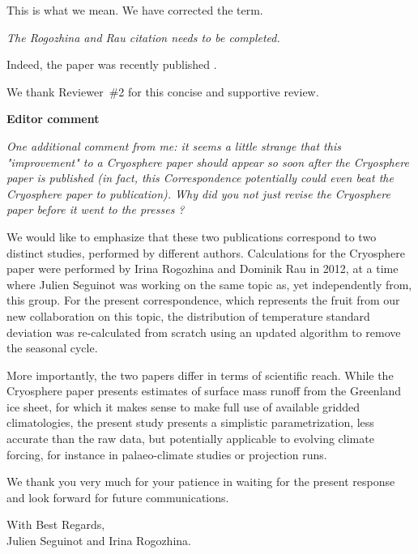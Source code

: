 \documentclass[10pt]{article}
\def\referee#1{\bigskip\textcolor{blue!50!black}{\textit{#1}}}
\begin{document}
This is what we mean. We have corrected the term.

\referee{The Rogozhina and Rau citation needs to be completed.}

Indeed, the paper was recently published \citep{rogozhina-rau-2014}. 

We thank Reviewer~{\#}2 for this concise and supportive review.


\bigskip
\textbf{Editor comment}

\referee{One additional comment from me: it seems a little strange that this "improvement" to a Cryosphere paper should appear so soon after the Cryosphere paper is published (in fact, this Correspondence potentially could even beat the Cryosphere paper to publication). Why did you not just revise the Cryosphere paper before it went to the presses ?}

We would like to emphasize that these two publications correspond to two distinct studies, performed by different authors. Calculations for the Cryosphere paper were performed by Irina Rogozhina and Dominik Rau in 2012, at a time where Julien Seguinot was working on the same topic as, yet independently from, this group. For the present correspondence, which represents the fruit from our new collaboration on this topic, the distribution of temperature standard deviation was re-calculated from scratch using an updated algorithm to remove the seasonal cycle.

More importantly, the two papers differ in terms of scientific reach. While the Cryosphere paper presents estimates of surface mass runoff from the Greenland ice sheet, for which it makes sense to make full use of available gridded climatologies, the present study presents a simplistic parametrization, less accurate than the raw data, but potentially applicable to evolving climate forcing, for instance in palaeo-climate studies or projection runs.

We thank you very much for your patience in waiting for the present response and look forward for future communications.

{\flushright
    With Best Regards,\\
    Julien Seguinot and Irina Rogozhina.\\
}



\end{document}

